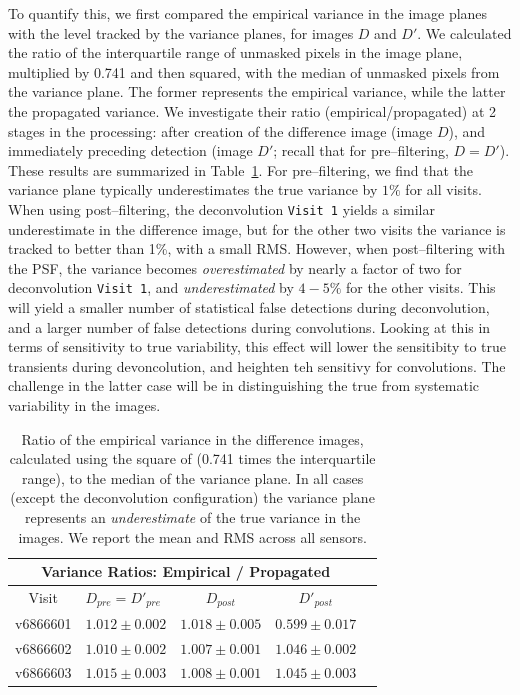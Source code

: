 \documentclass[floatfix, apj]{emulateapj}
\begin{document}
To quantify this, we first compared the empirical variance in the image planes with the level tracked by the variance planes, for images $D$ and $D'$.
We calculated the ratio of the interquartile range of unmasked pixels in the image plane, multiplied by 0.741 and then squared, with the median of unmasked pixels from the variance plane.
The former represents the empirical variance, while the latter the propagated variance.
We investigate their ratio (empirical/propagated) at 2 stages in the processing: after creation of the difference image (image $D$), and immediately preceding detection (image $D'$; recall that for pre--filtering, $D = D'$).
These results are summarized in Table~\ref{tab-variance1}.
For pre--filtering, we find that the variance plane typically underestimates the true variance by $1\%$ for all visits.
When using post--filtering, the deconvolution {\tt Visit 1} yields a similar underestimate in the difference image, but for the other two visits the variance is tracked to better than 1\%, with a small RMS.
However, when post--filtering with the PSF, the variance becomes {\it overestimated} by nearly a factor of two for deconvolution {\tt Visit 1}, and {\it underestimated} by $4-5\%$ for the other visits.
This will yield a smaller number of statistical false detections during deconvolution, and a larger number of false detections during convolutions.
Looking at this in terms of sensitivity to true variability, this effect will lower the sensitibity to true transients during devoncolution, and heighten teh sensitivy for convolutions.
The challenge in the latter case will be in distinguishing the true from systematic variability in the images.

\begin{table}[t]
\centering
\begin{tabular}{clccc}
\hline
\multicolumn{4}{|c|}{Variance Ratios: Empirical / Propagated} \\
\hline
Visit    & $D_{pre} = D'_{pre}$ & $D_{post}$ & $D'_{post}$ \\
\hline
v6866601 &$1.012 \pm 0.002$&$1.018 \pm 0.005$&$0.599 \pm 0.017$ \\
v6866602 &$1.010 \pm 0.002$&$1.007 \pm 0.001$&$1.046 \pm 0.002$ \\
v6866603 &$1.015 \pm 0.003$&$1.008 \pm 0.001$&$1.045 \pm 0.003$ \\
\end{tabular}
\caption{{\rm Ratio of the empirical variance in the difference images, calculated using the square of (0.741 times the interquartile range), to the median of the variance plane.
  In all cases (except the deconvolution configuration) the variance plane represents an {\it underestimate} of the true variance in the images.
  We report the mean and RMS across all sensors.
\label{tab-variance1}}}
\end{table}
\end{document}
